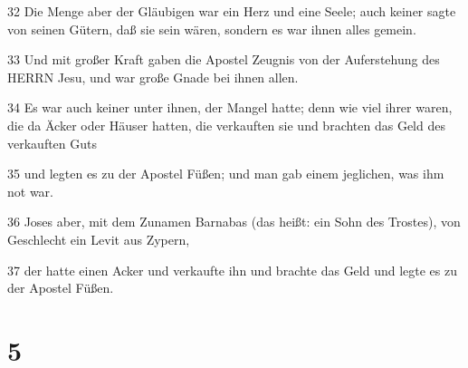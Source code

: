 \par 32 Die Menge aber der Gläubigen war ein Herz und eine Seele; auch keiner sagte von seinen Gütern, daß sie sein wären, sondern es war ihnen alles gemein.
\par 33 Und mit großer Kraft gaben die Apostel Zeugnis von der Auferstehung des HERRN Jesu, und war große Gnade bei ihnen allen.
\par 34 Es war auch keiner unter ihnen, der Mangel hatte; denn wie viel ihrer waren, die da Äcker oder Häuser hatten, die verkauften sie und brachten das Geld des verkauften Guts
\par 35 und legten es zu der Apostel Füßen; und man gab einem jeglichen, was ihm not war.
\par 36 Joses aber, mit dem Zunamen Barnabas (das heißt: ein Sohn des Trostes), von Geschlecht ein Levit aus Zypern,
\par 37 der hatte einen Acker und verkaufte ihn und brachte das Geld und legte es zu der Apostel Füßen.

\chapter{5}

